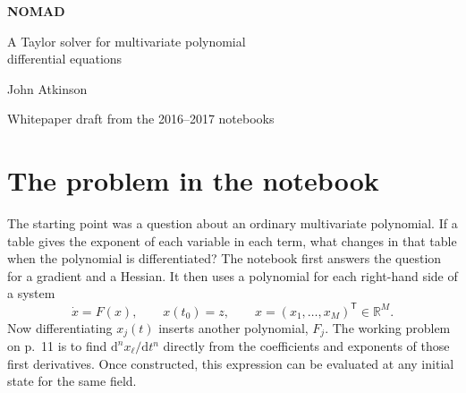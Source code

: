 \documentclass[11pt,letterpaper]{article}
\newcommand{\RR}{\mathbb{R}}
\newcommand{\dd}{\mathrm{d}}
\begin{document}
\begin{center}
{\LARGE\bfseries NOMAD\par}
\vspace{.4em}
{\Large A Taylor solver for multivariate polynomial\\[.15em] differential equations\par}
\vspace{.8em}
{\large John Atkinson\par}
\vspace{.3em}
{\small Whitepaper draft from the 2016--2017 notebooks\par}
\end{center}
\begin{abstract}
For an autonomous polynomial system, every time derivative of the solution is
itself a polynomial in the current state. NOMAD constructs those polynomials
before a time step is taken. It stores the exponent of each monomial in one
column and the coefficients for all components of the system in a matching
column. A single differentiation combines an old column with a column of the
vector field, subtracts one from the exponent of the differentiated variable,
and adds contributions with equal exponents. This paper derives both the explicit
formula for the \(n\)th derivative and the sliding matrix procedure for computing
it. A two-variable example follows the columns through to a Taylor step.
The final part of the notebook gives an exponential-quotient representation for
circular and hyperbolic functions of polynomial arguments. Finding a comparable
higher-derivative algorithm for that representation remained open in the notes.
\end{abstract}

\section{The problem in the notebook}\label{sec:problem}
The starting point was a question about an ordinary multivariate polynomial.
If a table gives the exponent of each variable in each term, what changes in
that table when the polynomial is differentiated? The notebook first answers
the question for a gradient and a Hessian. It then uses a polynomial for each
right-hand side of a system
\begin{equation}\label{eq:ivp}
   \dot x=F(x),\qquad x(t_0)=z,\qquad x=(x_1,\ldots,x_M)^\mathsf{T}\in\RR^M .
\end{equation}
Now differentiating \(x_j(t)\) inserts another polynomial, \(F_j\). The working
problem on p.~11 is to find \(\dd^n x_\ell/\dd t^n\) directly from the
coefficients and exponents of those first derivatives. Once constructed, this
expression can be evaluated at any initial state for the same field.
\end{document}

